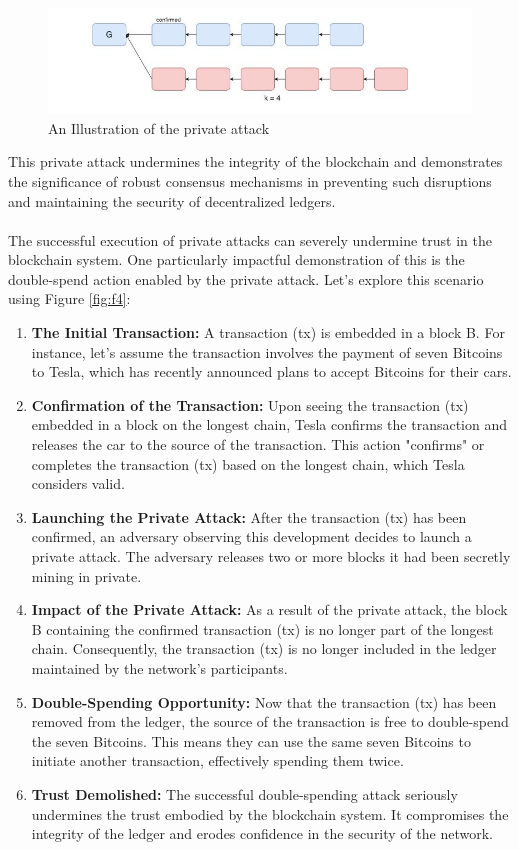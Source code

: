 \documentclass{report}
\begin{document}
\begin{center}
	\begin{figure}[h!]
		\centering
		\includegraphics[width=0.6\linewidth]{Fig/F3}
		\caption{An Illustration of the private attack}
		\label{fig:f3}
	\end{figure}
\end{center}
This private attack undermines the integrity of the blockchain and demonstrates the significance of robust consensus mechanisms in preventing such disruptions and maintaining the security of decentralized ledgers.\\\\
The successful execution of private attacks can severely undermine trust in the blockchain system. One particularly impactful demonstration of this is the double-spend action enabled by the private attack. Let's explore this scenario using Figure \ref{fig:f4}:
\begin{enumerate}
	\item \textbf{The Initial Transaction:} A transaction (tx) is embedded in a block B. For instance, let's assume the transaction involves the payment of seven Bitcoins to Tesla, which has recently announced plans to accept Bitcoins for their cars.
	\item \textbf{Confirmation of the Transaction:} Upon seeing the transaction (tx) embedded in a block on the longest chain, Tesla confirms the transaction and releases the car to the source of the transaction. This action "confirms" or completes the transaction (tx) based on the longest chain, which Tesla considers valid.
	\item \textbf{Launching the Private Attack:} After the transaction (tx) has been confirmed, an adversary observing this development decides to launch a private attack. The adversary releases two or more blocks it had been secretly mining in private.
	\item \textbf{Impact of the Private Attack:} As a result of the private attack, the block B containing the confirmed transaction (tx) is no longer part of the longest chain. Consequently, the transaction (tx) is no longer included in the ledger maintained by the network's participants.
	\item \textbf{Double-Spending Opportunity:} Now that the transaction (tx) has been removed from the ledger, the source of the transaction is free to double-spend the seven Bitcoins. This means they can use the same seven Bitcoins to initiate another transaction, effectively spending them twice.
	\item \textbf{Trust Demolished:} The successful double-spending attack seriously undermines the trust embodied by the blockchain system. It compromises the integrity of the ledger and erodes confidence in the security of the network.
\end{enumerate}
\end{document}

